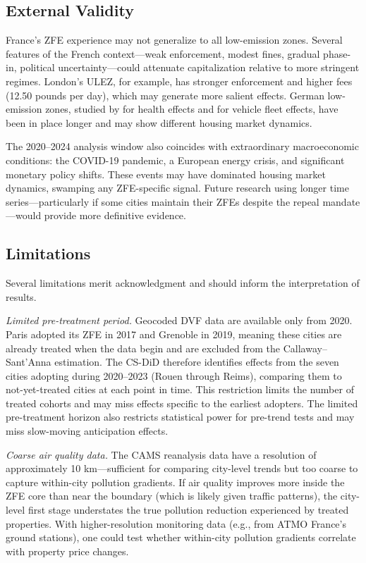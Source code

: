 \documentclass[12pt]{article}
\begin{document}
\subsection{External Validity}

France's ZFE experience may not generalize to all low-emission zones. Several features of the French context---weak enforcement, modest fines, gradual phase-in, political uncertainty---could attenuate capitalization relative to more stringent regimes. London's ULEZ, for example, has stronger enforcement and higher fees (12.50 pounds per day), which may generate more salient effects. German low-emission zones, studied by \citet{gehrsitz2017effect} for health effects and \citet{wolff2014keep} for vehicle fleet effects, have been in place longer and may show different housing market dynamics.

The 2020--2024 analysis window also coincides with extraordinary macroeconomic conditions: the COVID-19 pandemic, a European energy crisis, and significant monetary policy shifts. These events may have dominated housing market dynamics, swamping any ZFE-specific signal. Future research using longer time series---particularly if some cities maintain their ZFEs despite the repeal mandate---would provide more definitive evidence.

\subsection{Limitations}

Several limitations merit acknowledgment and should inform the interpretation of results.

\textit{Limited pre-treatment period.} Geocoded DVF data are available only from 2020. Paris adopted its ZFE in 2017 and Grenoble in 2019, meaning these cities are already treated when the data begin and are excluded from the Callaway--Sant'Anna estimation. The CS-DiD therefore identifies effects from the seven cities adopting during 2020--2023 (Rouen through Reims), comparing them to not-yet-treated cities at each point in time. This restriction limits the number of treated cohorts and may miss effects specific to the earliest adopters. The limited pre-treatment horizon also restricts statistical power for pre-trend tests and may miss slow-moving anticipation effects.

\textit{Coarse air quality data.} The CAMS reanalysis data have a resolution of approximately 10 km---sufficient for comparing city-level trends but too coarse to capture within-city pollution gradients. If air quality improves more inside the ZFE core than near the boundary (which is likely given traffic patterns), the city-level first stage understates the true pollution reduction experienced by treated properties. With higher-resolution monitoring data (e.g., from ATMO France's ground stations), one could test whether within-city pollution gradients correlate with property price changes.
\end{document}
